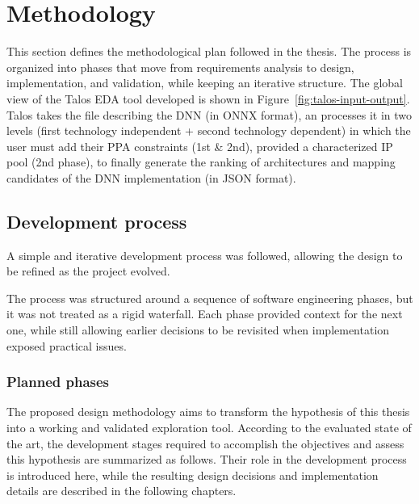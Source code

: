 \clearpage
\section{Methodology}
This section defines the methodological plan followed in the thesis.
The process is organized into phases that move from requirements
analysis to design, implementation, and validation, while keeping an
iterative structure. The global view of the Talos EDA tool developed
is shown in Figure~\ref{fig:talos-input-output}. Talos takes the 
file describing the DNN (in ONNX format), an processes it in two
levels (first technology independent + second technology dependent) in
which the user must add their PPA constraints (1st \& 2nd), provided a
characterized IP pool (2nd phase), to finally generate the ranking of 
architectures and mapping candidates of the DNN implementation (in
JSON format).

\subsection{Development process}

A simple and iterative development process was followed, allowing the
design to be refined as the project evolved.


The process was structured around a sequence of software engineering
phases, but it was not treated as a rigid waterfall. Each phase
provided context for the next one, while still allowing earlier
decisions to be revisited when implementation exposed practical
issues.

\subsubsection{Planned phases}
\label{subsec:planned_phases}
The proposed design methodology aims to transform the hypothesis of
this thesis into a working and validated exploration tool. According
to the evaluated state of the art, the development stages required to
accomplish the objectives and assess this hypothesis are summarized as
follows. Their role in the development process is introduced here,
while the resulting design decisions and implementation details are
described in the following chapters.

